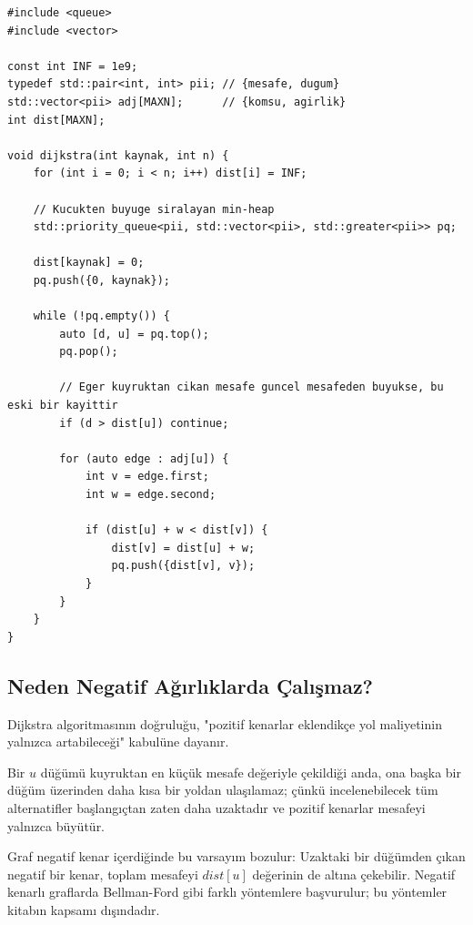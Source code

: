 \begin{lstlisting}[language=CTemel]
#include <queue>
#include <vector>

const int INF = 1e9;
typedef std::pair<int, int> pii; // {mesafe, dugum}
std::vector<pii> adj[MAXN];      // {komsu, agirlik}
int dist[MAXN];

void dijkstra(int kaynak, int n) {
    for (int i = 0; i < n; i++) dist[i] = INF;
    
    // Kucukten buyuge siralayan min-heap
    std::priority_queue<pii, std::vector<pii>, std::greater<pii>> pq;
    
    dist[kaynak] = 0;
    pq.push({0, kaynak});
    
    while (!pq.empty()) {
        auto [d, u] = pq.top();
        pq.pop();
        
        // Eger kuyruktan cikan mesafe guncel mesafeden buyukse, bu eski bir kayittir
        if (d > dist[u]) continue;
        
        for (auto edge : adj[u]) {
            int v = edge.first;
            int w = edge.second;
            
            if (dist[u] + w < dist[v]) {
                dist[v] = dist[u] + w;
                pq.push({dist[v], v});
            }
        }
    }
}
\end{lstlisting}

\subsection{Neden Negatif Ağırlıklarda Çalışmaz?}
Dijkstra algoritmasının doğruluğu, "pozitif kenarlar eklendikçe yol maliyetinin yalnızca artabileceği" kabulüne dayanır.

Bir $u$ düğümü kuyruktan en küçük mesafe değeriyle çekildiği anda, ona başka bir düğüm üzerinden daha kısa bir yoldan ulaşılamaz; çünkü incelenebilecek tüm alternatifler başlangıçtan zaten daha uzaktadır ve pozitif kenarlar mesafeyi yalnızca büyütür.

Graf negatif kenar içerdiğinde bu varsayım bozulur: Uzaktaki bir düğümden çıkan negatif bir kenar, toplam mesafeyi $dist[u]$ değerinin de altına çekebilir. Negatif kenarlı graflarda Bellman-Ford gibi farklı yöntemlere başvurulur; bu yöntemler kitabın kapsamı dışındadır.

